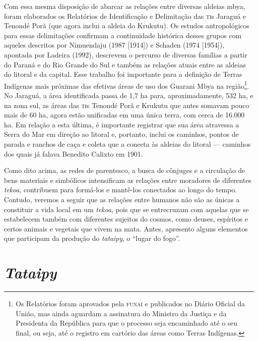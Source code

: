 Com essa mesma disposição de abarcar as relações entre diversas aldeias
mbya, foram elaborados os Relatórios de Identificação e Delimitação das
\textsc{ti}s Jaraguá e Tenondé Porã (que agora inclui a aldeia do Krukutu). Os
estudos antropológicos para essas delimitações confirmam a continuidade
histórica desses grupos com aqueles descritos por Nimuendaju (1987
[1914]) e Schaden (1974 [1954]), apontada por Ladeira (1992), descrevem
o percurso de diversas famílias a partir do Paraná e do Rio Grande do
Sul e também as relações atuais entre as aldeias do litoral e da
capital. Esse trabalho foi importante para a definição de Terras
Indígenas mais próximas das efetivas áreas de uso dos Guarani Mbya na
região\footnote{Os Relatórios foram aprovados pela \textsc{funai} e publicados
no Diário Oficial da União, mas ainda aguardam a assinatura do Ministro
da Justiça e da Presidenta da República para que o processo seja
encaminhado até o seu final, ou seja, até o registro em cartório das
áreas como Terras Indígenas.}. No Jaraguá, a área identificada passa de
1,7 ha para, aproximadamente, 532 ha, e na zona sul, as áreas das \textsc{ti}s
Tenondé Porã e Krukutu que antes somavam pouco mais de 60 ha, agora
estão unificadas em uma única terra, com cerca de 16.000 ha. Em relação
a esta última, é importante registrar que sua área atravessa a Serra do
Mar em direção ao litoral e, portanto, inclui os caminhos, pontos de
parada e ranchos de caça e coleta que a conecta às aldeias do litoral ---
caminhos dos quais já falava Benedito Calixto em 1901.

Como dito acima, as redes de parentesco, a busca de cônjuges e a
circulação de bens materiais e simbólicos intensificam as relações
entre moradores de diferentes \emph{tekoa}, contribuem para formá-los e
mantê-los conectados ao longo do tempo. Contudo, veremos a seguir que
as relações entre humanos não são as únicas a constituir a vida local
em um \emph{tekoa}, pois que se entrecruzam com aquelas que se estabelecem
também com diferentes sujeitos do cosmos, como deuses, espíritos e
certos animais e vegetais que vivem na mata. Antes, apresento alguns
elementos que participam da produção do \emph{tataipy}, o ``lugar do fogo''.

\section{\emph{Tataipy}}

